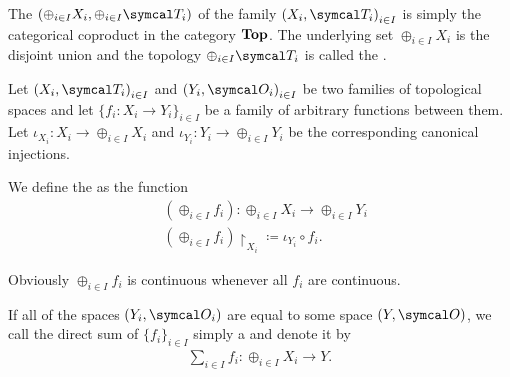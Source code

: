\begin{definition}\label{def:topological_sum}\cite[74]{Engelking1989}
  The  $(\oplus_{i \in I} X_i, \oplus_{i \in I} \Cal{T}_i)$ of the family ${ (X_i, \Cal{T}_i) }_{i \in I}$ is simply the categorical coproduct in the category $\operatorname{\mathbf{Top}}$. The underlying set $\oplus_{i \in I} X_i$ is the disjoint union and the topology $\oplus_{i \in I} \Cal{T}_i$ is called the .

  Let ${ (X_i, \Cal{T}_i) }_{i \in I}$ and ${ (Y_i, \Cal{O}_i) }_{i \in I}$ be two families of topological spaces and let $\{ f_i: X_i \to Y_i \}_{i \in I}$ be a family of arbitrary functions between them. Let $\iota_{X_i}: X_i \to \oplus_{i \in I} X_i$ and $\iota_{Y_i}: Y_i \to \oplus_{i \in I} Y_i$ be the corresponding canonical injections.

  We define the  as the function
  \begin{align*}
    &(\oplus_{i \in I} f_i): \oplus_{i \in I} X_i \to \oplus_{i \in I} Y_i \\
    &(\oplus_{i \in I} f_i){\restriction}_{X_i} \coloneqq \iota_{Y_i} \circ f_i.
  \end{align*}

  Obviously $\oplus_{i \in I} f_i$ is continuous whenever all $f_i$ are continuous.

  If all of the spaces $(Y_i, \Cal{O}_i)$ are equal to some space $(Y, \Cal{O})$, we call the direct sum of $\{ f_i \}_{i \in I}$ simply a  and denote it by
  \begin{align*}
    \sum_{i \in I} f_i: \oplus_{i \in I} X_i \to Y.
  \end{align*}
\end{definition}
